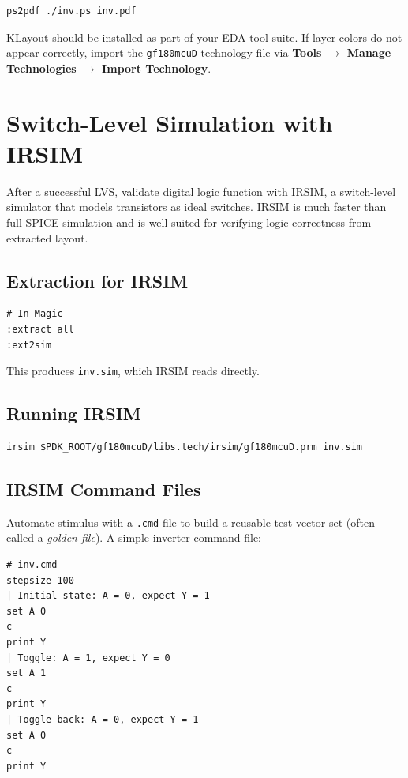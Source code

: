 \documentclass[11pt]{article}
\begin{document}
\begin{lstlisting}
ps2pdf ./inv.ps inv.pdf
\end{lstlisting}

KLayout should be installed as part of your EDA tool suite.
If layer colors do not appear correctly, import the
\texttt{gf180mcuD} technology file via
\textbf{Tools $\rightarrow$ Manage Technologies $\rightarrow$
Import Technology}.

\section{Switch-Level Simulation with IRSIM}

After a successful LVS, validate digital logic function with IRSIM, a
switch-level simulator that models transistors as ideal switches.
IRSIM is much faster than full SPICE simulation and is well-suited for
verifying logic correctness from extracted layout.

\subsection{Extraction for IRSIM}

\begin{lstlisting}
# In Magic
:extract all
:ext2sim
\end{lstlisting}

This produces \texttt{inv.sim}, which IRSIM reads directly.

\subsection{Running IRSIM}

\begin{lstlisting}
irsim $PDK_ROOT/gf180mcuD/libs.tech/irsim/gf180mcuD.prm inv.sim
\end{lstlisting}

\subsection{IRSIM Command Files}

Automate stimulus with a \texttt{.cmd} file to build a reusable test
vector set (often called a \emph{golden file}).
A simple inverter command file:

\begin{lstlisting}
# inv.cmd
stepsize 100
| Initial state: A = 0, expect Y = 1
set A 0
c
print Y
| Toggle: A = 1, expect Y = 0
set A 1
c
print Y
| Toggle back: A = 0, expect Y = 1
set A 0
c
print Y
\end{lstlisting}
\end{document}

